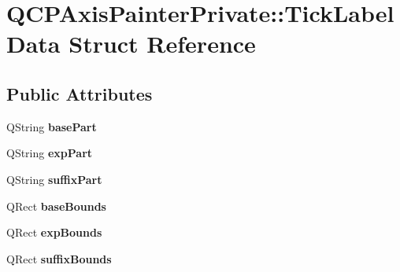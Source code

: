 \hypertarget{struct_q_c_p_axis_painter_private_1_1_tick_label_data}{}\section{Q\+C\+P\+Axis\+Painter\+Private\+:\+:Tick\+Label\+Data Struct Reference}
\label{struct_q_c_p_axis_painter_private_1_1_tick_label_data}
\subsection*{Public Attributes}
\begin{DoxyCompactItemize}
\item 
Q\+String {\bfseries base\+Part}\hypertarget{struct_q_c_p_axis_painter_private_1_1_tick_label_data_ad65b76a5cafc412179a20b5d79809fc4}{}\label{struct_q_c_p_axis_painter_private_1_1_tick_label_data_ad65b76a5cafc412179a20b5d79809fc4}

\item 
Q\+String {\bfseries exp\+Part}\hypertarget{struct_q_c_p_axis_painter_private_1_1_tick_label_data_a09692e4ea092137278b4ac051d5fdf2b}{}\label{struct_q_c_p_axis_painter_private_1_1_tick_label_data_a09692e4ea092137278b4ac051d5fdf2b}

\item 
Q\+String {\bfseries suffix\+Part}\hypertarget{struct_q_c_p_axis_painter_private_1_1_tick_label_data_a3cbf21c6411730a318f8d2287b77d840}{}\label{struct_q_c_p_axis_painter_private_1_1_tick_label_data_a3cbf21c6411730a318f8d2287b77d840}

\item 
Q\+Rect {\bfseries base\+Bounds}\hypertarget{struct_q_c_p_axis_painter_private_1_1_tick_label_data_aac1047ae6ab8e9f5a42923082aabfff5}{}\label{struct_q_c_p_axis_painter_private_1_1_tick_label_data_aac1047ae6ab8e9f5a42923082aabfff5}

\item 
Q\+Rect {\bfseries exp\+Bounds}\hypertarget{struct_q_c_p_axis_painter_private_1_1_tick_label_data_a6722d2bcefb93011e9dc42301b966846}{}\label{struct_q_c_p_axis_painter_private_1_1_tick_label_data_a6722d2bcefb93011e9dc42301b966846}

\item 
Q\+Rect {\bfseries suffix\+Bounds}\hypertarget{struct_q_c_p_axis_painter_private_1_1_tick_label_data_aa286a44422223bd4f0b044cc822079f6}{}\label{struct_q_c_p_axis_painter_private_1_1_tick_label_data_aa286a44422223bd4f0b044cc822079f6}


\end{DoxyCompactItemize}
